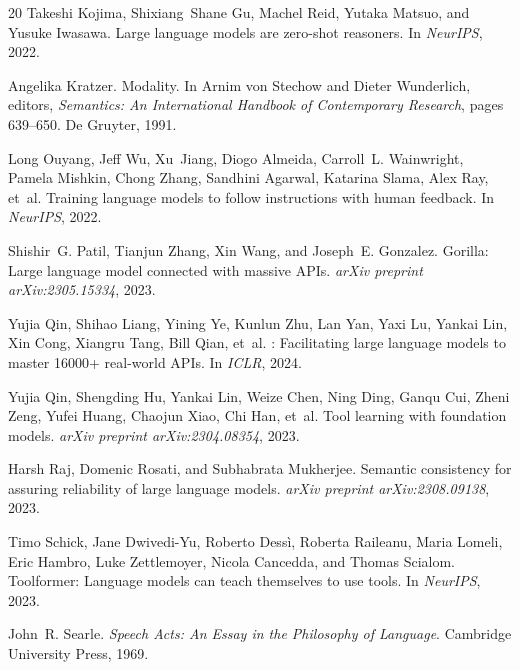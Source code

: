 \documentclass{article}
\begin{document}
\begin{thebibliography}{20}
Takeshi Kojima, Shixiang~Shane Gu, Machel Reid, Yutaka Matsuo, and Yusuke Iwasawa.
\newblock Large language models are zero-shot reasoners.
\newblock In \emph{NeurIPS}, 2022.

Angelika Kratzer.
\newblock Modality.
\newblock In Arnim von Stechow and Dieter Wunderlich, editors, \emph{Semantics: An International Handbook of Contemporary Research}, pages 639--650. De Gruyter, 1991.

Long Ouyang, Jeff Wu, Xu~Jiang, Diogo Almeida, Carroll~L. Wainwright, Pamela Mishkin, Chong Zhang, Sandhini Agarwal, Katarina Slama, Alex Ray, et~al.
\newblock Training language models to follow instructions with human feedback.
\newblock In \emph{NeurIPS}, 2022.

Shishir~G. Patil, Tianjun Zhang, Xin Wang, and Joseph~E. Gonzalez.
\newblock Gorilla: Large language model connected with massive {APIs}.
\newblock \emph{arXiv preprint arXiv:2305.15334}, 2023.

Yujia Qin, Shihao Liang, Yining Ye, Kunlun Zhu, Lan Yan, Yaxi Lu, Yankai Lin, Xin Cong, Xiangru Tang, Bill Qian, et~al.
: Facilitating large language models to master 16000+ real-world {APIs}.
\newblock In \emph{ICLR}, 2024.

Yujia Qin, Shengding Hu, Yankai Lin, Weize Chen, Ning Ding, Ganqu Cui, Zheni Zeng, Yufei Huang, Chaojun Xiao, Chi Han, et~al.
\newblock Tool learning with foundation models.
\newblock \emph{arXiv preprint arXiv:2304.08354}, 2023.

Harsh Raj, Domenic Rosati, and Subhabrata Mukherjee.
\newblock Semantic consistency for assuring reliability of large language models.
\newblock \emph{arXiv preprint arXiv:2308.09138}, 2023.

Timo Schick, Jane Dwivedi-Yu, Roberto Dess{\`{i}}, Roberta Raileanu, Maria Lomeli, Eric Hambro, Luke Zettlemoyer, Nicola Cancedda, and Thomas Scialom.
\newblock Toolformer: Language models can teach themselves to use tools.
\newblock In \emph{NeurIPS}, 2023.

John~R. Searle.
\newblock \emph{Speech Acts: An Essay in the Philosophy of Language}.
\newblock Cambridge University Press, 1969.


\end{thebibliography}
\end{document}
